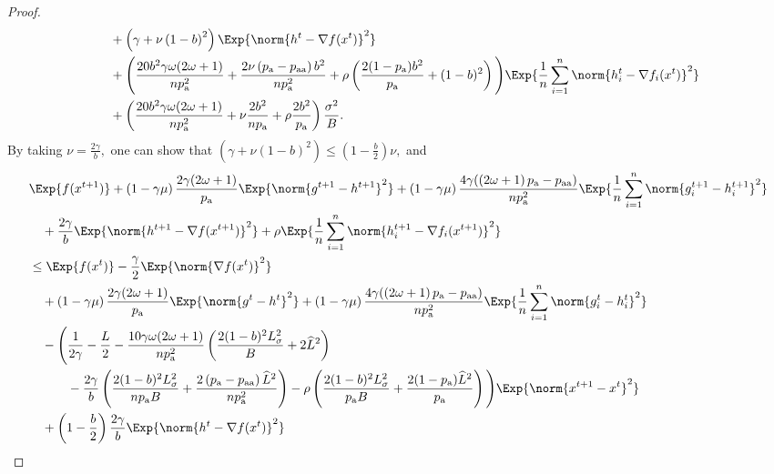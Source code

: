 \documentclass{article}
\newcommand*{\probavailable}{\ensuremath{p_{\textnormal{a}}}}
\newcommand*{\probpairaa}{\ensuremath{p_{\textnormal{aa}}}}
\begin{document}
\begin{proof}
\begin{align*}
        &\quad + \left(\gamma + \nu \left(1 - b\right)^2\right) \Exp{\norm{h^{t} - \nabla f(x^{t})}^2} \\
        &\quad + \Bigg(\frac{20 b^2 \gamma \omega (2 \omega + 1)}{n \probavailable^2} + \frac{2 \nu \left(\probavailable - \probpairaa\right) b^2}{n \probavailable^2} + \rho \left(\frac{2 (1 - \probavailable) b^2}{\probavailable} + (1 - b)^2\right)\Bigg)\Exp{\frac{1}{n}\sum_{i=1}^n\norm{h^{t}_i - \nabla f_i(x^{t})}^2} \\
        &\quad + \left(\frac{20 b^2 \gamma \omega (2 \omega + 1)}{n \probavailable^2} + \nu \frac{2 b^2}{n \probavailable} + \rho \frac{2 b^2}{\probavailable}\right) \frac{\sigma^2}{B}.
      \end{align*}
      By taking $\nu = \frac{2\gamma}{b},$ one can show that $\left(\gamma + \nu (1 - b)^2\right) \leq \left(1 - \frac{b}{2}\right)\nu,$ and
      \begin{align*}
        &\Exp{f(x^{t + 1})} + \left(1 - \gamma \mu\right)\frac{2\gamma (2 \omega + 1)}{\probavailable} \Exp{\norm{g^{t+1} - h^{t+1}}^2} + \left(1 - \gamma \mu\right)\frac{4\gamma (\left(2 \omega + 1\right)\probavailable - \probpairaa)}{n \probavailable^2} \Exp{\frac{1}{n}\sum_{i=1}^n\norm{g^{t+1}_i - h^{t+1}_i}^2}\\
        &\quad  + \frac{2\gamma}{b} \Exp{\norm{h^{t+1} - \nabla f(x^{t+1})}^2} + \rho \Exp{\frac{1}{n}\sum_{i=1}^n\norm{h^{t+1}_i - \nabla f_i(x^{t+1})}^2}\\
        &\leq \Exp{f(x^t)} - \frac{\gamma}{2}\Exp{\norm{\nabla f(x^t)}^2} \\
        &\quad + \left(1 - \gamma \mu\right)\frac{2\gamma (2 \omega + 1)}{\probavailable} \Exp{\norm{g^{t} - h^{t}}^2} + \left(1 - \gamma \mu\right)\frac{4\gamma (\left(2 \omega + 1\right)\probavailable - \probpairaa)}{n \probavailable^2} \Exp{\frac{1}{n}\sum_{i=1}^n\norm{g^{t}_i - h^{t}_i}^2} \\
        &\quad - \Bigg(\frac{1}{2\gamma} - \frac{L}{2} - \frac{10 \gamma \omega (2 \omega + 1)}{n \probavailable^2} \left(\frac{2 (1 - b)^2 L_{\sigma}^2}{B} + 2 \widehat{L}^2\right) \\
        &\qquad\quad - \frac{2\gamma}{b}\left(\frac{2 (1 - b)^2 L_{\sigma}^2}{n \probavailable B} + \frac{2\left(\probavailable - \probpairaa\right) \widehat{L}^2}{n \probavailable^2} \right) - \rho \left(\frac{2 (1 - b)^2 L_{\sigma}^2}{\probavailable B} + \frac{2(1 - \probavailable) \widehat{L}^2}{\probavailable}\right)\Bigg) \Exp{\norm{x^{t+1} - x^t}^2} \\
        &\quad + \left(1 - \frac{b}{2}\right)\frac{2\gamma}{b} \Exp{\norm{h^{t} - \nabla f(x^{t})}^2} \\

\end{align*}
\end{proof}
\end{document}
